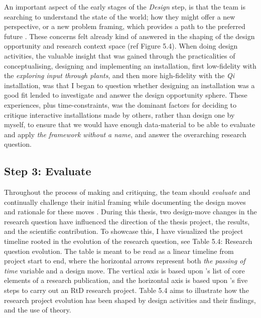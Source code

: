  An important aspect of the early stages of the \emph{Design} step, is that the team is searching to understand the state of the world; how they might offer a new perspective, or a new problem framing, which provides a path to the preferred future \autocite[p. 185]{zimmerman_research_2014}. These concerns felt already kind of answered in the shaping of the design opportunity and research context space (ref Figure 5.4). When doing design activities, the valuable insight that was gained through the practicalities of conceptualising, designing and implementing an installation, first low-fidelity with the \emph{exploring input through plants}, and then more high-fidelity with the \emph{Qi} installation, was that I began to question whether designing an installation was a good fit lended to investigate and answer the design opportunity sphere. These experiences, plus time-constraints, was the dominant factors for deciding to critique interactive installations made by others, rather than design one by myself, to ensure that we would have enough data-material to be able to evaluate and apply \emph{the framework without a name}, and answer the overarching research question. 


\subsection{Step 3: Evaluate}
Throughout the process of making and critiquing, the team should \textit{evaluate} and continually challenge their initial framing while documenting the design moves and rationale for these moves \autocite[p. 185]{zimmerman_research_2014}. During this thesis, two design-move changes in the research question have influenced the direction of the thesis project, the results, and the scientific contribution. To showcase this, I have visualized the project timeline rooted in the evolution of the research question, see Table 5.4: Research question evolution. The table is meant to be read as a linear timeline from project start to end, where the horizontal arrows represent both \emph{the passing of time} variable and a design move. The vertical axis is based upon \autocite{beck_examining_2016}'s list of core elements of a research publication, and the horizontal axis is based upon \autocite{zimmerman_research_2014}'s five steps to carry out an RtD research project. Table 5.4 aims to illustrate how the research project evolution has been shaped by design activities and their findings, and the use of theory. 

